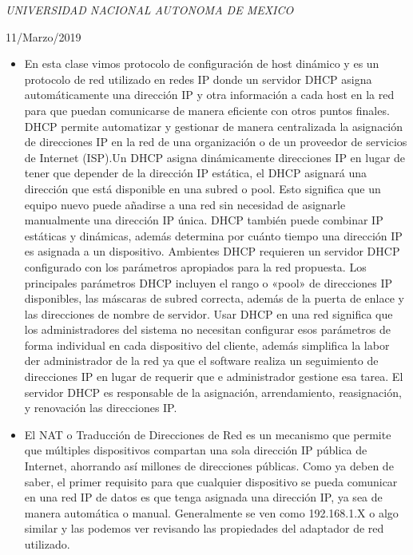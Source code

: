 \documentclass[a4paper, 11pt, oneside]{article}
\begin{document}
\begin{titlepage}
	\textit{UNIVERSIDAD NACIONAL AUTONOMA DE MEXICO} 
	
	\vfill
	
	
	
	
	\vspace{0.3\baselineskip} 
	
	11/Marzo/2019 
	
	 

\end{titlepage}
\begin{itemize}
    \item En esta clase vimos protocolo de configuración de host dinámico y es un protocolo de red utilizado en redes IP donde un servidor DHCP asigna automáticamente una dirección IP y otra información a cada host en la red para que puedan comunicarse de manera eficiente con otros puntos finales. DHCP permite automatizar y gestionar de manera centralizada la asignación de direcciones IP en la red de una organización o de un proveedor de servicios de Internet (ISP).Un DHCP asigna dinámicamente direcciones IP en lugar de tener que depender de la dirección IP estática, el DHCP asignará una dirección que está disponible en una subred o pool. Esto significa que un equipo nuevo puede añadirse a una red sin necesidad de asignarle manualmente una dirección IP única. DHCP también puede combinar IP estáticas y dinámicas, además determina por cuánto tiempo una dirección IP es asignada a un dispositivo. Ambientes DHCP requieren un servidor DHCP configurado con los parámetros apropiados para la red propuesta. Los principales parámetros DHCP incluyen el rango o «pool» de direcciones IP disponibles, las máscaras de subred correcta, además de la puerta de enlace y las direcciones de nombre de servidor. Usar DHCP en una red significa que los administradores del sistema no necesitan configurar esos parámetros de forma individual en cada dispositivo del cliente, además simplifica la labor der administrador de la red ya que el software realiza un seguimiento de direcciones IP en lugar de requerir que e administrador gestione esa tarea.
    El servidor DHCP es responsable de la asignación, arrendamiento, reasignación, y renovación las direcciones IP.
    \item El NAT o Traducción de Direcciones de Red es un mecanismo que permite que múltiples dispositivos compartan una sola dirección IP pública de Internet, ahorrando así millones de direcciones públicas. Como ya deben de saber, el primer requisito para que cualquier dispositivo se pueda comunicar en una red IP de datos es que tenga asignada una dirección IP, ya sea de manera automática o manual. Generalmente se ven como 192.168.1.X o algo similar y las podemos ver revisando las propiedades del adaptador de red utilizado. 
\end{itemize}
\end{document}
